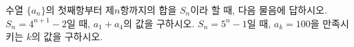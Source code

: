 수열 $\{a_n\}$의 첫째항부터 제$n$항까지의 합을 $S_n$이라 할 때, 다음 물음에 답하시오.
 $S_n=4^{n+1}-2$일 때, $a_1+a_4$의 값을 구하시오.
 $S_n=5^n-1$일 때, $a_k=100$을 만족시키는 $k$의 값을 구하시오.
